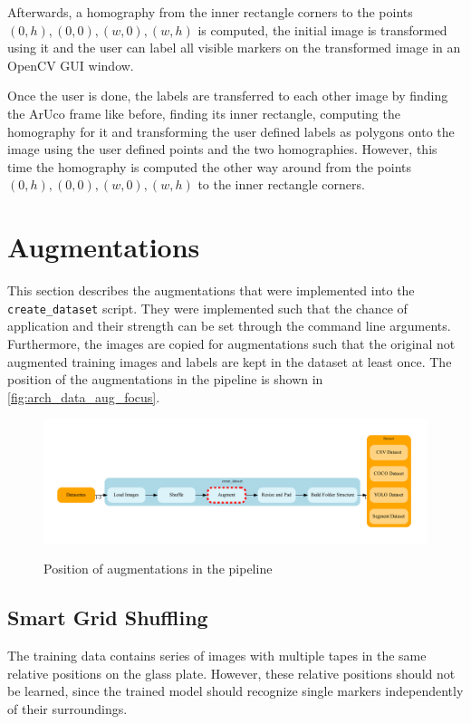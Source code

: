 \documentclass[10pt]{book}
\begin{document}
Afterwards, a homography from the inner rectangle corners to the points $(0,h), (0,0), (w,0), (w,h)$ is computed, the initial image is transformed using it and the user can label all visible markers on the transformed image in an \ac{OpenCV} \ac{GUI} window.

Once the user is done, the labels are transferred to each other image by finding the \ac{ArUco} frame like before, finding its inner rectangle, computing the homography for it and transforming the user defined labels as polygons onto the image using the user defined points and the two homographies. However, this time the homography is computed the other way around from the points $(0,h), (0,0), (w,0), (w,h)$ to the inner rectangle corners.

\section{Augmentations}

This section describes the augmentations that were implemented into the \texttt{create\_dataset} script. They were implemented such that the chance of application and their strength can be set through the command line arguments. Furthermore, the images are copied for augmentations such that the original not augmented training images and labels are kept in the dataset at least once. The position of the augmentations in the pipeline is shown in \autoref{fig:arch_data_aug_focus}.

\begin{figure}
  \caption{Position of augmentations in the pipeline}
  \includegraphics[width=\textwidth]{graph/arch_data_aug_focus}
  \label{fig:arch_data_aug_focus}
\end{figure}

\subsection{Smart Grid Shuffling}

The training data contains series of images with multiple tapes in the same relative positions on the glass plate. However, these relative positions should not be learned, since the trained model should recognize single markers independently of their surroundings. 
\end{document}
